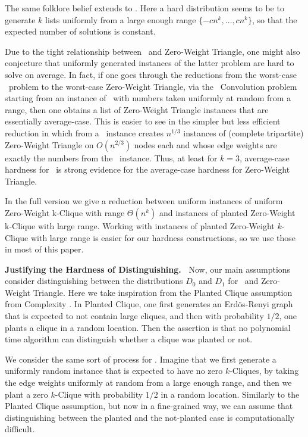The same folklore belief extends to \kSum. Here a hard distribution seems to be to generate $k$ lists uniformly from a large enough range $\{-cn^k,\ldots, cn^k\}$, so that the expected number of solutions is constant. 

Due to the tight relationship between \ThSum~and Zero-Weight Triangle, one might also conjecture that uniformly generated instances of the latter problem are hard to solve on average. In fact, if one goes through the reductions from the worst-case \ThSum~problem to the worst-case Zero-Weight Triangle, via the \ThSum~Convolution problem \cite{Patrascu10,WilliamsW13j} starting from an instance of \ThSum~with numbers taken uniformly at random from a range, then one obtains a list of Zero-Weight Triangle instances that are essentially average-case. This is easier to see in the simpler but less efficient reduction in \cite{WilliamsW13j} which from a \ThSum~instance creates $n^{1/3}$ instances of (complete tripartite) Zero-Weight Triangle on $O(n^{2/3})$ nodes each and whose edge weights are exactly the numbers from the \ThSum~instance. Thus, at least for $k=3$, average-case hardness for \ThSum~is strong evidence for the average-case hardness for Zero-Weight Triangle.

In the full version we give a reduction between uniform instances of uniform Zero-Weight k-Clique with range $\Theta(n^k)$ and instances of planted Zero-Weight k-Clique with large range. Working with instances of planted Zero-Weight $k$-Clique with large range is easier for our hardness constructions, so we use those in most of this paper.  

\textbf{Justifying the Hardness of Distinguishing.~}
Now, our main assumptions consider distinguishing between the distributions $D_0$ and $D_1$ for
\ThSum~and Zero-Weight Triangle. Here we take inspiration from the Planted Clique assumption from Complexity \cite{HazanK11,Jerrum92,Kucera95}. In Planted Clique, one first generates an Erd\"os-Renyi graph that is expected to not contain large cliques, and then with probability $1/2$, one plants a clique in a random location. Then the assertion is that no polynomial time algorithm can distinguish whether a clique was planted or not.

We consider the same sort of process for \zkclique. Imagine that we first generate a uniformly random instance that is expected to have no zero $k$-Cliques, by taking the edge weights uniformly at random from a large enough range, and then we plant a zero $k$-Clique with probability $1/2$ in a random location. Similarly to the Planted Clique assumption, but now in a fine-grained way, we can assume that distinguishing between the planted and the not-planted case is computationally difficult.

